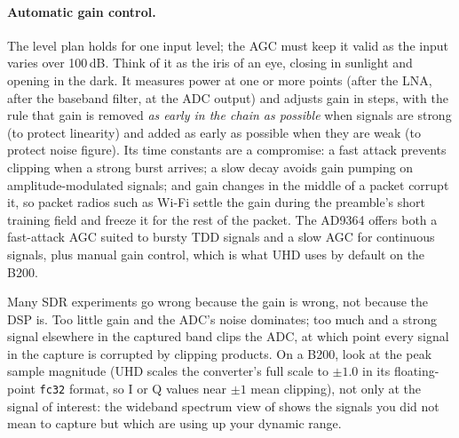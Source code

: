 \paragraph{Automatic gain control.} The level plan holds for one input level; the AGC must keep it valid
as the input varies over 100\,dB. Think of it as the iris of an eye, closing in sunlight and opening in
the dark. It measures power at one or more points (after the LNA, after the
baseband filter, at the ADC output) and adjusts gain in steps, with the rule that gain is removed
\emph{as early in the chain as possible} when signals are strong (to protect linearity) and added as
early as possible when they are weak (to protect noise figure). Its time constants are a compromise: a
fast attack prevents clipping when a strong burst arrives; a slow decay avoids gain pumping on
amplitude-modulated signals; and gain changes in the middle of a packet corrupt it, so packet radios
such as Wi-Fi settle the gain during the preamble's short training field and freeze it for the rest of
the packet. The AD9364 offers both a fast-attack AGC suited to bursty TDD signals and a slow AGC for
continuous signals, plus manual gain control, which is what UHD uses by default on the B200.

\begin{pitfall}
Many SDR experiments go wrong because the gain is wrong, not because the DSP is. Too little gain and
the ADC's noise dominates; too much and a strong signal elsewhere in the captured band clips the ADC, at
which point every signal in the capture is corrupted by clipping products. On a B200, look at the
peak sample magnitude (UHD scales the converter's full scale to $\pm1.0$ in its floating-point
\texttt{fc32} format, so I or Q values near $\pm1$ mean clipping), not only at the signal of interest: the wideband spectrum view of
 shows the signals you did not mean to capture but which are using up
your dynamic range.
\end{pitfall}


